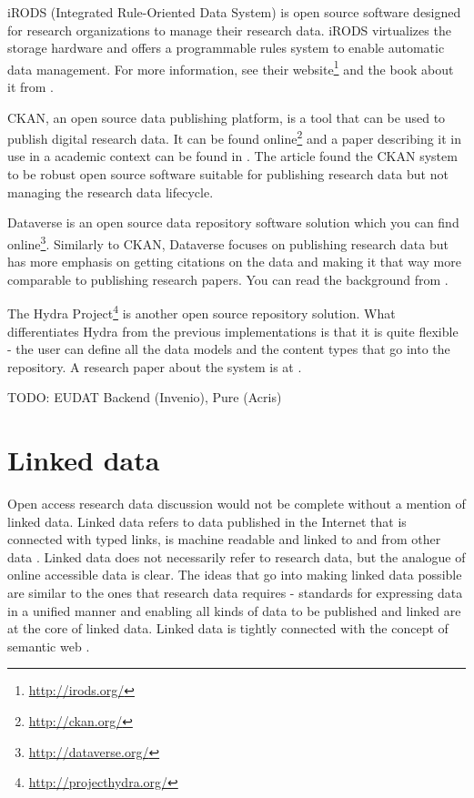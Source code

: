 iRODS (Integrated Rule-Oriented Data System) is open source software designed
for research organizations to manage their research data. iRODS virtualizes the
storage hardware and offers a programmable rules system to enable automatic
data management. For more information, see their website\footnote{\url{http://irods.org/}} and
the book about it from \cite{DBLP:series/synthesis/2010Rajasekar}.

CKAN, an open source data publishing platform, is a tool that can be used to
publish digital research data. It can be found online\footnote{\url{http://ckan.org/}} and
a paper describing it in use in a academic context can be found in
\cite{winn2013open}. The article found the CKAN system to be robust open source
software suitable for publishing research data but not managing the research
data lifecycle.

Dataverse is an open source data repository software solution which you can
find online\footnote{\url{http://dataverse.org/}}. Similarly to CKAN, Dataverse
focuses on publishing research data but has more emphasis on getting
citations on the data and making it that way more comparable to publishing
research papers. You can read the background from \cite{king2007introduction}.

The Hydra Project\footnote{\url{http://projecthydra.org/}} is another open
source repository solution. What differentiates Hydra from the previous
implementations is that it is quite flexible - the user can define all the data
models and the content types that go into the repository. A research paper
about the system is at \cite{awre2009project}.

TODO: EUDAT Backend (Invenio), Pure (Acris)

\section{Linked data}

Open access research data discussion would not be complete without a mention
of linked data. Linked data refers to data published in the Internet that is connected
with typed links, is machine readable and linked to and from other data
\cite{DBLP:journals/ijswis/BizerHB09}. Linked data does not necessarily refer
to research data, but the analogue of online accessible data is clear. The
ideas that go into making linked data possible are similar to the ones that
research data requires - standards for expressing data in a unified manner and
enabling all kinds of data to be published and linked are at the core of linked
data. Linked data is tightly connected with the concept of semantic web
\cite{berners2001semantic}.

